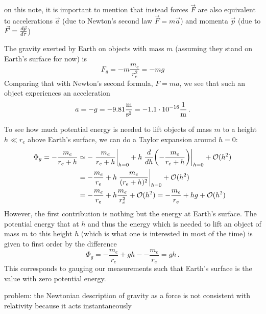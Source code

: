 on this note, it is important to mention that instead forces $\vec{F}$ are also equivalent to accelerations $\vec{a}$ (due to Newton's second law $\vec{F} = m \vec{a}$) and momenta $\vec{p}$ (due to $\vec{F} = \dv{\vec{p}}{\tau}$)


\begin{ex}
The gravity exerted by Earth on objects with mass $m$ (assuming they stand on Earth's surface for now) is
\begin{equation}
F_g = - m \frac{m_e}{r_e^2} = - m g
\end{equation}
Comparing that with Newton's second formula, $F = m a$, we see that such an object experiences an acceleration
\begin{equation}
a = - g = - 9.81 \frac{\metre}{\second^2} = - 1.1 \cdot 10^{-16} \frac{1}{\metre} \, .
\end{equation}

To see how much potential energy is needed to lift objects of mass $m$ to a height $h \ll r_e$ above Earth's surface, we can do a Taylor expansion around $h = 0$:
\begin{align*}
\Phi_g = - \frac{m_e}{r_e + h} &\simeq - \eval{\frac{m_e}{r_e + h}}_{h = 0} + h \eval{\dv{h}\qty(- \frac{m_e}{r_e + h})}_{h = 0} + \mathcal{O}(h^2)
\\
&= - \frac{m_e}{r_e} + h \eval{\frac{m_e}{(r_e + h)^2}}_{h = 0} + \mathcal{O}(h^2)
\\
&= - \frac{m_e}{r_e} + h \frac{m_e}{r_e^2} + \mathcal{O}(h^2) = - \frac{m_e}{r_e} + h g + \mathcal{O}(h^2)
\end{align*}
However, the first contribution is nothing but the energy at Earth's surface. The potential energy that at $h$ and thus the energy which is needed to lift an object of mass $m$ to this height $h$ (which is what one is interested in most of the time) is given to first order by the difference
\begin{equation}
\Phi_g =  - \frac{m_e}{r_e} + g h - - \frac{m_e}{r_e} = g h \, .
\end{equation}
This corresponds to gauging our measurements such that Earth's surface is the value with zero potential energy.
\end{ex}


problem: the Newtonian description of gravity as a force is not consistent with relativity because it acts instantaneously



